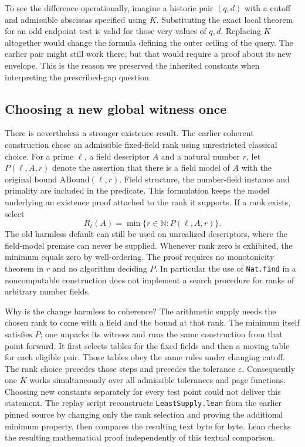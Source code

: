 \documentclass[12pt,letterpaper]{article}
\begin{document}
To see the difference operationally, imagine a historic pair \((q,d)\) with a cutoff and admissible abscissas specified using \(K\). Substituting the exact local theorem for an odd endpoint test is valid for those very values of \(q,d\). Replacing \(K\) altogether would change the formula defining the outer ceiling of the query. The earlier pair might still work there, but that would require a proof about its new envelope. This is the reason we preserved the inherited constants when interpreting the prescribed-gap question.

\subsection{Choosing a new global witness once}
There is nevertheless a stronger existence result. The earlier coherent construction chose an admissible fixed-field rank using unrestricted classical choice. For a prime \(\ell\), a field descriptor \(A\) and a natural number \(r\), let \(P(\ell,A,r)\) denote the assertion that there is a field model of \(A\) with the original bound \(\mathrm{ABound}(\ell,r)\). Field structure, the number-field instance and primality are included in the predicate. This formulation keeps the model underlying an existence proof attached to the rank it supports. If a rank exists, select
\[
    R_\ell(A)=\min\{r\in\mathbb N:P(\ell,A,r)\}.
\]
The old harmless default can still be used on unrealized descriptors, where the field-model premise can never be supplied. Whenever rank zero is exhibited, the minimum equals zero by well-ordering. The proof requires no monotonicity theorem in \(r\) and no algorithm deciding \(P\). In particular the use of \texttt{Nat.find} in a noncomputable construction does not implement a search procedure for ranks of arbitrary number fields.

Why is the change harmless to coherence? The arithmetic supply needs the chosen rank to come with a field and the bound at that rank. The minimum itself satisfies \(P\); one unpacks its witness and runs the same construction from that point forward. It first selects tables for the fixed fields and then a moving table for each eligible pair. Those tables obey the same rules under changing cutoff. The rank choice precedes those steps and precedes the tolerance \(\varepsilon\). Consequently one \(K\) works simultaneously over all admissible tolerances and page functions. Choosing new constants separately for every test point could not deliver this statement. The replay script reconstructs \texttt{LeastSupply.lean} from the earlier pinned source by changing only the rank selection and proving the additional minimum property, then compares the resulting text byte for byte. Lean checks the resulting mathematical proof independently of this textual comparison.
\end{document}
